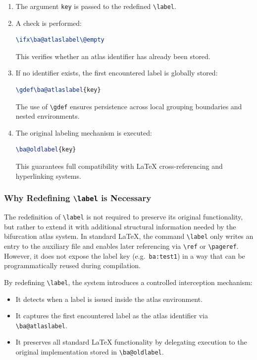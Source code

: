 \begin{enumerate}
\item The argument \lstinline|key| is passed to the redefined \lstinline|\label|.
\item A check is performed:
\begin{lstlisting}[language=LaTeX]
\ifx\ba@atlaslabel\@empty
\end{lstlisting}
This verifies whether an atlas identifier has already been stored.
\item If no identifier exists, the first encountered label is globally stored:
\begin{lstlisting}[language=LaTeX]
\gdef\ba@atlaslabel{key}
\end{lstlisting}
The use of \lstinline|\gdef| ensures persistence across local grouping boundaries and nested environments.
\item The original labeling mechanism is executed:
\begin{lstlisting}[language=LaTeX]
\ba@oldlabel{key}
\end{lstlisting}
This guarantees full compatibility with \LaTeX{} cross-referencing and hyperlinking systems.
\end{enumerate}
\subsubsection{Why Redefining \texttt{\textbackslash label} is Necessary}

The redefinition of \lstinline|\label| is not required to preserve its original functionality, but rather to extend it with additional structural information needed by the bifurcation atlas system. In standard \LaTeX{}, the command \lstinline|\label| only writes an entry to the auxiliary file and enables later referencing via \lstinline|\ref| or \lstinline|\pageref|. However, it does not expose the label key (e.g.\ \texttt{ba:test1}) in a way that can be programmatically reused during compilation.

By redefining \lstinline|\label|, the system introduces a controlled interception mechanism:

\begin{itemize}
\item It detects when a label is issued inside the atlas environment.
\item It captures the first encountered label as the atlas identifier via \lstinline|\ba@atlaslabel|.
\item It preserves all standard \LaTeX{} functionality by delegating execution to the original implementation stored in \lstinline|\ba@oldlabel|.
\end{itemize}

